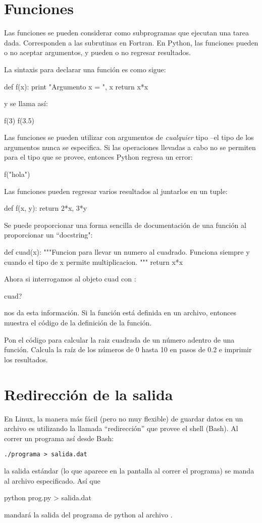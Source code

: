 \section{Funciones}
Las funciones se pueden considerar como subprogramas que ejecutan una tarea dada. Corresponden a las subrutinas en Fortran. En Python, las funciones pueden o no aceptar argumentos, y pueden o no regresar resultados.

La sintaxis para declarar una función es como sigue:
\begin{python}
def f(x):
  print "Argumento x = ", x
  return x*x
\end{python}
y se llama así:
\begin{python}
f(3)
f(3.5)
\end{python}

Las funciones se pueden utilizar con argumentos de \emph{cualquier} tipo --el tipo de los argumentos nunca se especifica. Si las operaciones llevadas a cabo no se permiten para el tipo que se provee, entonces Python regresa un error:
\begin{python}
f("hola")
\end{python}

Las funciones pueden regresar varios resultados al juntarlos en un tuple:
\begin{python}
def f(x, y):
  return 2*x, 3*y
\end{python}

Se puede proporcionar una forma sencilla de documentación de una función al proporcionar un ``docstring":
\begin{python}
def cuad(x):
  """Funcion para llevar un numero al cuadrado.
  Funciona siempre y cuando el tipo de x permite multiplicacion.
  """
  return x*x
\end{python}
Ahora si interrogamos al objeto cuad con :
\begin{python}
cuad?
\end{python}
nos da esta información. Si la función está definida en un archivo, entonces
 muestra el código de la definición de la función.

\ej Pon el código para calcular la raiz cuadrada de un número adentro de una función. Calcula la raíz de los números de 0 hasta 10 en pasos de 0.2 e imprimir los resultados.

\section{Redirección de la salida}
En Linux, la manera más fácil (pero no muy flexible) de guardar datos en un archivo es utilizando la llamada ``redirección'' que provee el shell (Bash). Al correr un programa así desde Bash:
\begin{verbatim}
./programa > salida.dat
\end{verbatim}
la salida estándar (lo que aparece en la pantalla al correr el programa) se manda al archivo especificado. 
Así que
\begin{python}
python prog.py > salida.dat
\end{python}
mandará la salida del programa de python  al archivo .

